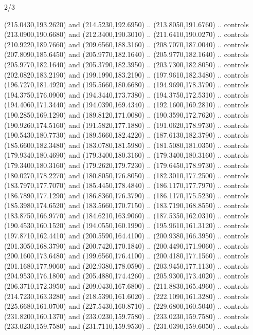 \begin{flagdescription}{2/3}
\begin{scope}[xshift=0.5\flaglength,yshift=0.5\flagwidth,scale=\flagwidth/259.2]
\begin{scope}[y=0.8pt, x=0.8pt, yscale=-1,shift={(-243,-162)}]
      (215.0430,193.2620) and (214.5230,192.6950) .. (213.8050,191.6760) .. controls
      (213.0900,190.6680) and (212.3400,190.3010) .. (211.6410,190.0270) .. controls
      (210.9220,189.7660) and (209.6560,188.3160) .. (208.7070,187.0040) .. controls
      (207.8090,185.6450) and (205.9770,182.1640) .. (205.9770,182.1640) .. controls
      (205.9770,182.1640) and (205.3790,182.3950) .. (203.7300,182.8050) .. controls
      (202.0820,183.2190) and (199.1990,183.2190) .. (197.9610,182.3480) .. controls
      (196.7270,181.4920) and (195.5660,180.6680) .. (194.9690,178.3790) .. controls
      (194.3750,176.0900) and (194.3440,173.7380) .. (194.3750,172.5310) .. controls
      (194.4060,171.3440) and (194.0390,169.4340) .. (192.1600,169.2810) .. controls
      (190.2850,169.1290) and (189.8120,171.0080) .. (190.3590,172.7620) .. controls
      (190.9260,174.5160) and (191.5820,177.1880) .. (191.0620,178.9730) .. controls
      (190.5430,180.7730) and (189.5660,182.4220) .. (187.6130,182.3790) .. controls
      (185.6600,182.3480) and (183.0780,181.5980) .. (181.5080,181.0350) .. controls
      (179.9340,180.4690) and (179.3400,180.3160) .. (179.3400,180.3160) .. controls
      (179.3400,180.3160) and (179.2620,179.7230) .. (179.6450,178.9730) .. controls
      (180.0270,178.2270) and (180.8050,176.8050) .. (182.3010,177.2500) .. controls
      (183.7970,177.7070) and (185.4450,178.4840) .. (186.1170,177.7970) .. controls
      (186.7890,177.1290) and (186.8360,176.3790) .. (186.1170,175.5230) .. controls
      (185.3980,174.6520) and (183.5660,170.7150) .. (183.7190,168.8550) .. controls
      (183.8750,166.9770) and (184.6210,163.9060) .. (187.5350,162.0310) .. controls
      (190.4530,160.1520) and (194.0550,160.1990) .. (195.9610,161.3120) .. controls
      (197.8710,162.4410) and (200.5590,164.4100) .. (200.9380,166.3950) .. controls
      (201.3050,168.3790) and (200.7420,170.1840) .. (200.4490,171.9060) .. controls
      (200.1600,173.6480) and (199.6560,176.4100) .. (200.4180,177.1560) .. controls
      (201.1680,177.9060) and (202.9380,178.0590) .. (203.9450,177.1130) .. controls
      (204.9530,176.1800) and (205.4880,174.4260) .. (205.9300,173.4020) .. controls
      (206.3710,172.3950) and (209.0430,167.6800) .. (211.8830,165.4960) .. controls
      (214.7230,163.3280) and (218.5390,161.6020) .. (222.1090,161.3280) .. controls
      (225.6680,161.0700) and (227.5430,160.8710) .. (229.6800,160.5040) .. controls
      (231.8200,160.1370) and (233.0230,159.7580) .. (233.0230,159.7580) .. controls
      (233.0230,159.7580) and (231.7110,159.9530) .. (231.0390,159.6050) .. controls

\end{scope}
\end{scope}
\end{flagdescription}
